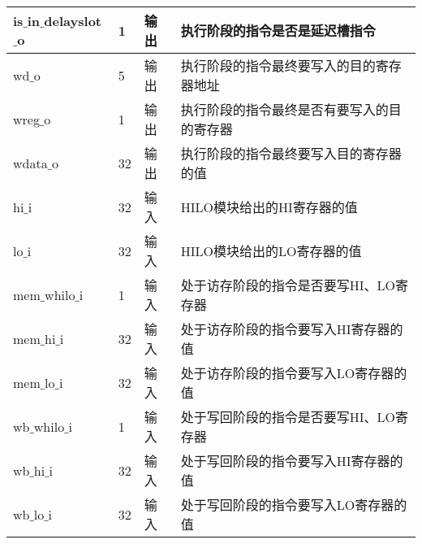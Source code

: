 \begin{table}[H]
\begin{tabular}{|l|l|l|l|}
		\hline
		is$\_$in$\_$delayslot$\_$o & 1 & 输出 & 执行阶段的指令是否是延迟槽指令 \\
		\hline
		wd$\_$o & 5 & 输出 & 执行阶段的指令最终要写入的目的寄存器地址 \\
		\hline
		wreg$\_$o & 1 & 输出 & 执行阶段的指令最终是否有要写入的目的寄存器 \\
		\hline
		wdata$\_$o & 32 & 输出 & 执行阶段的指令最终要写入目的寄存器的值 \\
		\hline
		hi$\_$i & 32 & 输入 & HILO模块给出的HI寄存器的值 \\
		\hline
		lo$\_$i & 32 & 输入 & HILO模块给出的LO寄存器的值 \\
		\hline
		mem$\_$whilo$\_$i & 1 & 输入 & 处于访存阶段的指令是否要写HI、LO寄存器 \\
		\hline
		mem$\_$hi$\_$i & 32 & 输入 & 处于访存阶段的指令要写入HI寄存器的值 \\
		\hline
		mem$\_$lo$\_$i & 32 & 输入 & 处于访存阶段的指令要写入LO寄存器的值 \\
		\hline
		wb$\_$whilo$\_$i & 1 & 输入 & 处于写回阶段的指令是否要写HI、LO寄存器 \\
		\hline
		wb$\_$hi$\_$i & 32 & 输入 & 处于写回阶段的指令要写入HI寄存器的值 \\
		\hline
		wb$\_$lo$\_$i & 32 & 输入 & 处于写回阶段的指令要写入LO寄存器的值 \\
		\hline
	\end{tabular}
\end{table}
